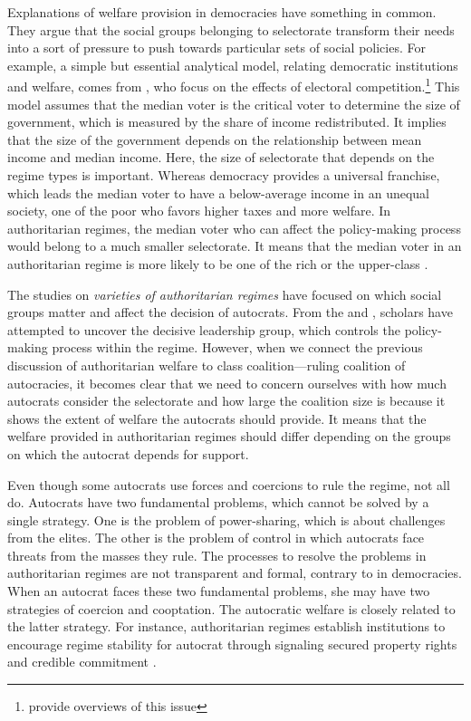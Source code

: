 \documentclass[11pt, notitlepage]{article}
\begin{document}
Explanations of welfare provision in democracies have something in common. They argue that the social groups belonging to selectorate transform their needs into a sort of pressure to push towards particular sets of social policies. For example, a simple but essential analytical model, relating democratic institutions and welfare, comes from \citet{Meltzer1981}, who focus on the effects of electoral competition.\footnote{\citet{Boix2003} provide overviews of this issue} This model assumes that the median voter is the critical voter to determine the size of government, which is measured by the share of income redistributed. It implies that the size of the government depends on the relationship between mean income and median income. Here, the size of selectorate that depends on the regime types is important. Whereas democracy provides a universal franchise, which leads the median voter to have a below-average income in an unequal society, one of the poor who favors higher taxes and more welfare. In authoritarian regimes, the median voter who can affect the policy-making process would belong to a much smaller selectorate. It means that the median voter in an authoritarian regime is more likely to be one of the rich or the upper-class \citep[2]{Yi2014}.\par

The studies on \textit{varieties of authoritarian regimes} have focused on which social groups matter and affect the decision of autocrats. From the \citet{Geddes1999} and \citet{Geddes2014}, scholars have attempted to uncover the decisive leadership group, which controls the policy-making process within the regime. However, when we connect the previous discussion of authoritarian welfare to class coalition---ruling coalition of autocracies, it becomes clear that we need to concern ourselves with how much autocrats consider the selectorate and how large the coalition size is because it shows the extent of welfare the autocrats should provide. It means that the welfare provided in authoritarian regimes should differ depending on the groups on which the autocrat depends for support.\par

Even though some autocrats use forces and coercions to rule the regime, not all do. Autocrats have two fundamental problems, which cannot be solved by a single strategy. One is the problem of power-sharing, which is about challenges from the elites. The other is the problem of control in which autocrats face threats from the masses they rule. The processes to resolve the problems in authoritarian regimes are not transparent and formal, contrary to in democracies. When an autocrat faces these two fundamental problems, she may have two strategies of coercion and cooptation. The autocratic welfare is closely related to the latter strategy. For instance, authoritarian regimes establish institutions to encourage regime stability for autocrat through signaling secured property rights and credible commitment \citep{Gandhi2007, Wright2008}.
\end{document}
